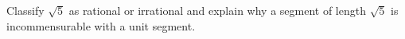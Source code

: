 Classify $\sqrt5$ as rational or irrational and explain why a segment of length $\sqrt5$ is incommensurable with a unit segment.
